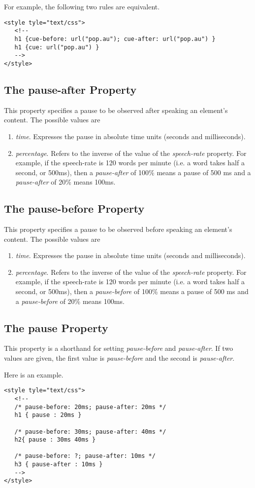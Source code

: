 \documentclass[a4paper,oneside]{book}
\numberwithin{equation}{chapter}
\begin{document}
For example, the following two rules are equivalent.
\begin{verbatim}
<style tyle="text/css">
   <!--
   h1 {cue-before: url("pop.au"); cue-after: url("pop.au") }
   h1 {cue: url("pop.au") }
   -->
</style>
\end{verbatim}
\subsection{The pause-after Property}
This property specifies a pause to be observed after speaking an element's content. The possible values are
\begin{enumerate}
\item \textit{time}. Expresses the pause in absolute time units (seconds and milliseconds).
\item \textit{percentage}. Refers to the inverse of the value of the \textit{speech-rate} property. For example, if the speech-rate is 120 words per minute (i.e. a word takes half a second, or 500ms), then a \textit{pause-after} of 100\% means a pause of 500 ms and a \textit{pause-after} of 20\% means 100ms.
\end{enumerate}
\subsection{The pause-before Property}
This property specifies a pause to be observed before speaking an element's content. The possible values are
\begin{enumerate}
\item \textit{time}. Expresses the pause in absolute time units (seconds and milliseconds).
\item \textit{percentage}. Refers to the inverse of the value of the \textit{speech-rate} property. For example, if the speech-rate is 120 words per minute (i.e. a word takes half a second, or 500ms), then a \textit{pause-before} of 100\% means a pause of 500 ms and a \textit{pause-before} of 20\% means 100ms.
\end{enumerate}
\subsection{The pause Property}
This property is a shorthand for setting \textit{pause-before} and \textit{pause-after}. If two values are given, the first value is \textit{pause-before} and the second is \textit{pause-after}.

Here is an example.
\begin{verbatim}
<style tyle="text/css">
   <!--
   /* pause-before: 20ms; pause-after: 20ms */
   h1 { pause : 20ms }  
	
   /* pause-before: 30ms; pause-after: 40ms */
   h2{ pause : 30ms 40ms }  
	
   /* pause-before: ?; pause-after: 10ms */
   h3 { pause-after : 10ms }
   -->
</style>
\end{verbatim}
\end{document}
